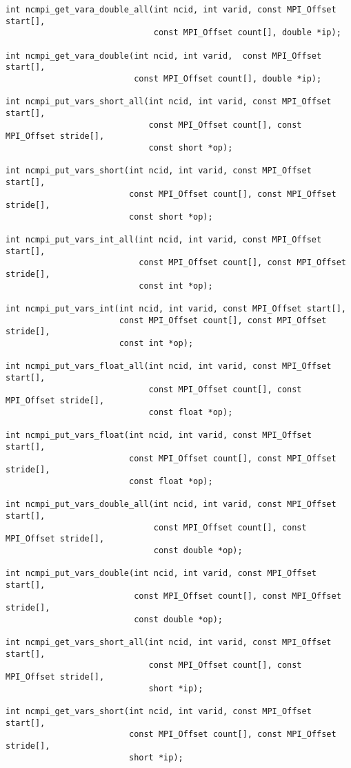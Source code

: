 \documentclass[10pt]{article}
\begin{document}
\begin{verbatim}
int ncmpi_get_vara_double_all(int ncid, int varid, const MPI_Offset start[],
                              const MPI_Offset count[], double *ip);

int ncmpi_get_vara_double(int ncid, int varid,  const MPI_Offset start[],
                          const MPI_Offset count[], double *ip);

int ncmpi_put_vars_short_all(int ncid, int varid, const MPI_Offset start[],
                             const MPI_Offset count[], const MPI_Offset stride[],
                             const short *op);

int ncmpi_put_vars_short(int ncid, int varid, const MPI_Offset start[],
                         const MPI_Offset count[], const MPI_Offset stride[],
                         const short *op);

int ncmpi_put_vars_int_all(int ncid, int varid, const MPI_Offset start[],
                           const MPI_Offset count[], const MPI_Offset stride[],
                           const int *op);

int ncmpi_put_vars_int(int ncid, int varid, const MPI_Offset start[],
                       const MPI_Offset count[], const MPI_Offset stride[],
                       const int *op);

int ncmpi_put_vars_float_all(int ncid, int varid, const MPI_Offset start[],
                             const MPI_Offset count[], const MPI_Offset stride[],
                             const float *op);

int ncmpi_put_vars_float(int ncid, int varid, const MPI_Offset start[],
                         const MPI_Offset count[], const MPI_Offset stride[],
                         const float *op);

int ncmpi_put_vars_double_all(int ncid, int varid, const MPI_Offset start[],
                              const MPI_Offset count[], const MPI_Offset stride[],
                              const double *op);

int ncmpi_put_vars_double(int ncid, int varid, const MPI_Offset start[],
                          const MPI_Offset count[], const MPI_Offset stride[],
                          const double *op);

int ncmpi_get_vars_short_all(int ncid, int varid, const MPI_Offset start[],
                             const MPI_Offset count[], const MPI_Offset stride[],
                             short *ip);

int ncmpi_get_vars_short(int ncid, int varid, const MPI_Offset start[],
                         const MPI_Offset count[], const MPI_Offset stride[],
                         short *ip);


\end{verbatim}
\end{document}
